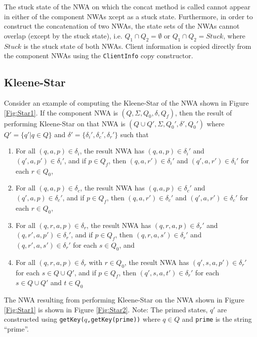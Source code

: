 \documentclass{llncs}
\begin{document}
The stuck state of the NWA on which the concat method is called cannot appear in either of the component NWAs xcept as a stuck state.  Furthermore, in order to construct the concatenation of two NWAs, the state sets of the NWAs cannot overlap (except by the stuck state), i.e. $Q_1 \cap Q_2 = \emptyset$ or $Q_1 \cap Q_2 = Stuck$, where $Stuck$ is the stuck state of both NWAs. Client information is copied directly from the component NWAs using the \texttt{ClientInfo} copy constructor.

\subsection{Kleene-Star}
\label{Se:Star}

Consider an example of computing the Kleene-Star of the NWA shown in Figure \ref{Fig:Star1}.  If the component NWA is $(Q, \Sigma, Q_0, \delta, Q_f)$, then the result of performing Kleene-Star on that NWA is $(Q \cup Q', \Sigma, Q_0', \delta', Q_0')$ where $Q' = \{q' | q \in Q\}$ and $\delta' = \{\delta_i',\delta_c',\delta_r'\}$ such that 

\begin{enumerate} 

\item For all $(q,a,p) \in \delta_i$, the result NWA has $(q,a,p) \in \delta_i'$ and $(q',a,p') \in \delta_i'$, and if $p \in Q_f$, then $(q,a,r') \in \delta_i'$ and $(q',a,r') \in \delta_i'$ for each $r \in Q_0$, 

\item For all $(q,a,p) \in \delta_c$, the result NWA has $(q,a,p) \in \delta_c'$ and $(q',a,p) \in \delta_c'$, and if $p \in Q_f$, then $(q,a,r') \in \delta_c'$ and $(q',a,r') \in \delta_c'$ for each $r \in Q_0$, 

\item For all $(q,r,a,p) \in \delta_r$, the result NWA has $(q,r,a,p) \in \delta_r'$ and $(q,r',a,p') \in \delta_r'$, and if $p \in Q_f$, then $(q,r,a,s') \in \delta_r'$ and $(q,r',a,s') \in \delta_r'$ for each $s \in Q_0$, and 

\item For all $(q,r,a,p) \in \delta_r$ with $r \in Q_0$, the result NWA has $(q',s,a,p') \in \delta_r'$ for each $s \in Q \cup Q'$, and if $p \in Q_f$, then $(q',s,a,t') \in \delta_r'$ for each $s \in Q \cup Q'$ and $t \in Q_0$

\end{enumerate}  

\noindent The NWA resulting from performing Kleene-Star on the NWA shown in Figure \ref{Fig:Star1} is shown in Figure \ref{Fig:Star2}.  Note: The primed states, $q'$ are constructed using \texttt{getKey($q$,getKey(prime))} where $q \in Q$ and \texttt{prime} is the string ``prime''.
\end{document}
